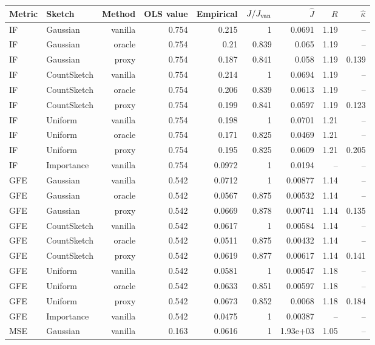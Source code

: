 \begin{table}[t]
\centering
\small
\begin{tabular}{llrrrrrrr}
\toprule
Metric & Sketch & Method & OLS value & Empirical & $J/J_{\rm van}$ & $\hat J$ & $R$ & $\hat\kappa$ \\
\midrule
IF & Gaussian & vanilla & 0.754 & 0.215 & 1 & 0.0691 & 1.19 & -- \\
IF & Gaussian & oracle & 0.754 & 0.21 & 0.839 & 0.065 & 1.19 & -- \\
IF & Gaussian & proxy & 0.754 & 0.187 & 0.841 & 0.058 & 1.19 & 0.139 \\
IF & CountSketch & vanilla & 0.754 & 0.214 & 1 & 0.0694 & 1.19 & -- \\
IF & CountSketch & oracle & 0.754 & 0.206 & 0.839 & 0.0613 & 1.19 & -- \\
IF & CountSketch & proxy & 0.754 & 0.199 & 0.841 & 0.0597 & 1.19 & 0.123 \\
IF & Uniform & vanilla & 0.754 & 0.198 & 1 & 0.0701 & 1.21 & -- \\
IF & Uniform & oracle & 0.754 & 0.171 & 0.825 & 0.0469 & 1.21 & -- \\
IF & Uniform & proxy & 0.754 & 0.195 & 0.825 & 0.0609 & 1.21 & 0.205 \\
IF & Importance & vanilla & 0.754 & 0.0972 & 1 & 0.0194 & -- & -- \\
\midrule
GFE & Gaussian & vanilla & 0.542 & 0.0712 & 1 & 0.00877 & 1.14 & -- \\
GFE & Gaussian & oracle & 0.542 & 0.0567 & 0.875 & 0.00532 & 1.14 & -- \\
GFE & Gaussian & proxy & 0.542 & 0.0669 & 0.878 & 0.00741 & 1.14 & 0.135 \\
GFE & CountSketch & vanilla & 0.542 & 0.0617 & 1 & 0.00584 & 1.14 & -- \\
GFE & CountSketch & oracle & 0.542 & 0.0511 & 0.875 & 0.00432 & 1.14 & -- \\
GFE & CountSketch & proxy & 0.542 & 0.0619 & 0.877 & 0.00617 & 1.14 & 0.141 \\
GFE & Uniform & vanilla & 0.542 & 0.0581 & 1 & 0.00547 & 1.18 & -- \\
GFE & Uniform & oracle & 0.542 & 0.0633 & 0.851 & 0.00597 & 1.18 & -- \\
GFE & Uniform & proxy & 0.542 & 0.0673 & 0.852 & 0.0068 & 1.18 & 0.184 \\
GFE & Importance & vanilla & 0.542 & 0.0475 & 1 & 0.00387 & -- & -- \\
\midrule
MSE & Gaussian & vanilla & 0.163 & 0.0616 & 1 & 1.93e+03 & 1.05 & -- \\

\end{tabular}
\end{table}

